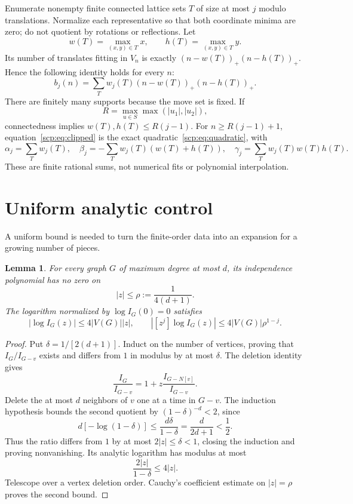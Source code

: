 \documentclass[11pt]{article}
\newtheorem{lemma}{Lemma}
\begin{document}
Enumerate nonempty finite connected lattice sets $T$ of size at most $j$ modulo translations. Normalize each representative so that both coordinate minima are zero; do not quotient by rotations or reflections. Let
\[
 w(T)=\max_{(x,y)\in T}x,\qquad h(T)=\max_{(x,y)\in T}y.
\]
Its number of translates fitting in $V_n$ is exactly $(n-w(T))_+(n-h(T))_+$. Hence the following identity holds for every $n$:
\begin{equation}\label{scp:eq:clipped}
 b_j(n)=\sum_T w_j(T)(n-w(T))_+(n-h(T))_+.
\end{equation}
There are finitely many supports because the move set is fixed. If
\[
 R=\max_{u\in S}\max(|u_1|,|u_2|),
\]
connectedness implies $w(T),h(T)\le R(j-1)$. For $n\ge R(j-1)+1$, equation~\eqref{scp:eq:clipped} is the exact quadratic~\eqref{scp:eq:quadratic}, with
\begin{equation}\label{scp:eq:alphabetagamma}
 \alpha_j=\sum_Tw_j(T),\quad
 \beta_j=-\sum_Tw_j(T)(w(T)+h(T)),\quad
 \gamma_j=\sum_Tw_j(T)w(T)h(T).
\end{equation}
These are finite rational sums, not numerical fits or polynomial interpolation.

\section{Uniform analytic control}\label{scp:sec:uniform}
A uniform bound is needed to turn the finite-order data into an expansion for a growing number of pieces.

\begin{lemma}\label{scp:lem:zerofree}
For every graph $G$ of maximum degree at most $d$, its independence polynomial has no zero on
\[
 |z|\le\rho:=\frac1{4(d+1)}.
\]
The logarithm normalized by $\log I_G(0)=0$ satisfies
\begin{equation}\label{scp:eq:bound}
 |\log I_G(z)|\le4|V(G)||z|,\qquad
 |[z^j]\log I_G(z)|\le4|V(G)|\rho^{1-j}.
\end{equation}
\end{lemma}
\begin{proof}
Put $\delta=1/[2(d+1)]$. Induct on the number of vertices, proving that $I_G/I_{G-v}$ exists and differs from $1$ in modulus by at most $\delta$. The deletion identity gives
\[
 \frac{I_G}{I_{G-v}}=1+z\frac{I_{G-N[v]}}{I_{G-v}}.
\]
Delete the at most $d$ neighbors of $v$ one at a time in $G-v$. The induction hypothesis bounds the second quotient by $(1-\delta)^{-d}<2$, since
\[
 d[-\log(1-\delta)]\le\frac{d\delta}{1-\delta}
 =\frac{d}{2d+1}<\frac12.
\]
Thus the ratio differs from $1$ by at most $2|z|\le\delta<1$, closing the induction and proving nonvanishing. Its analytic logarithm has modulus at most
\[
 \frac{2|z|}{1-\delta}\le4|z|.
\]
Telescope over a vertex deletion order. Cauchy's coefficient estimate on $|z|=\rho$ proves the second bound.
\end{proof}
\end{document}
